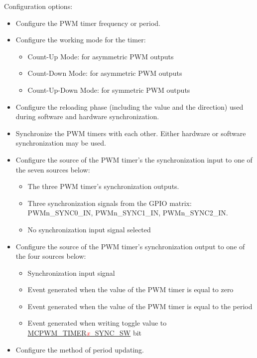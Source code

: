 \documentclass[main\_\_EN.tex]{subfiles}
\begin{document}
Configuration options:
\begin{itemize}
    \item Configure the PWM timer frequency or period.
    \item Configure the working mode for the timer:
        \begin{itemize}
            \item Count-Up Mode: for asymmetric PWM outputs
            \item Count-Down Mode: for asymmetric PWM outputs
            \item Count-Up-Down Mode: for symmetric PWM outputs
        \end{itemize}
    \item Configure the reloading phase (including the value and the direction) used during software and hardware synchronization.
    \item Synchronize the PWM timers with each other. Either hardware or software synchronization may be used.
    \item Configure the source of the PWM timer's the synchronization input to one of the seven sources below: 
        \begin{itemize}
            \item The three PWM timer's synchronization outputs.
            \item Three synchronization signals from the GPIO matrix: PWMn\_SYNC0\_IN, PWMn\_SYNC1\_IN, PWMn\_SYNC2\_IN.
            \item No synchronization input signal selected
        \end{itemize}
    \item Configure the source of the PWM timer's synchronization output to one of the four sources below: 
        \begin{itemize}
            \item Synchronization input signal
            \item Event generated when the value of the PWM timer is equal to zero
            \item Event generated when the value of the PWM timer is equal to the period
            \item Event generated when writing toggle value to \hyperref[fielddesc:MCPWMTIMER0SYNCSW]{MCPWM\_TIMER\textcolor{red}{\it{x}}\_SYNC\_SW} bit
        \end{itemize}
    \item Configure the method of period updating.
\end{itemize}
\end{document}
